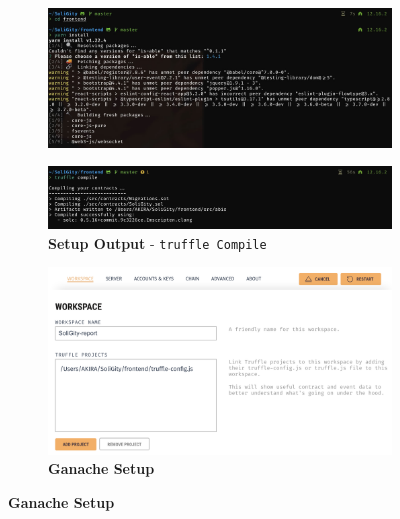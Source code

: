 \documentclass[12pt]{article}
\renewcommand{\_}{\kern-1.5pt\textunderscore\kern-1.5pt}
\begin{document}
\begin{figure}[H]
\begin{minipage}[t]{0.5\linewidth}
\begin{subfigure}[b]{\textwidth}
			\includegraphics[width=\textwidth]{graphs/04. yarn_install_frontend}
		\end{subfigure}
		\centering
		\begin{subfigure}[b]{\textwidth}
			\captionsetup{justification   = raggedright,
              singlelinecheck = false}
		\centering
				\caption*{\textbf{Setup Output} - \texttt{truffle Compile}}
		\includegraphics[width=\textwidth]{graphs/05. truffle_compile}
		\end{subfigure}
			\begin{subfigure}[b]{\textwidth}
	\captionsetup{justification   = raggedright,
              singlelinecheck = false}
		\centering
				\caption*{\textbf{Ganache Setup}}
		\includegraphics[width=\textwidth]{graphs/06. ganache_setup}
		\end{subfigure}


\end{minipage}
\end{figure}
\end{document}
